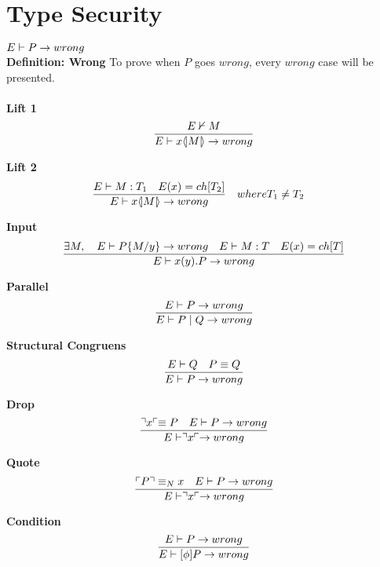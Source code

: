 \section{Type Security}

\begin{theorem}[Wrong]
\ensuremath{E \vdash P \ra wrong} \\
\textbf{Definition: Wrong}
To prove when \ensuremath{P} goes \ensuremath{wrong}, every \ensuremath{wrong} case will be presented.\\\\
\textbf{Lift 1} \begin{align*}
\frac{E \nvdash M}{E \vdash x \langle \! | M | \! \rangle \rightarrow wrong}
\end{align*}

\textbf{Lift 2} \begin{align*}
\frac{E \vdash M:T_1 \quad E(x)=ch[T_2]}{E \vdash x \langle \! | M | \! \rangle \rightarrow wrong} &\quad where T_1 \neq T_2
\end{align*}

\textbf{Input} \begin{align*}
\frac{\exists M,\quad E \vdash P\{ M/ y\} \rightarrow wrong \quad E \vdash M:T \quad E(x)= ch[T]} {E \vdash x(y).P \rightarrow wrong}\\
\end{align*}

\textbf{Parallel} \begin{align*}
\frac{E \vdash P \rightarrow wrong}{E \vdash P \mid Q \rightarrow wrong}
\end{align*}

\textbf{Structural Congruens} \begin{align*}
\frac{E \vdash Q \quad P \equiv Q}{E \vdash P \rightarrow wrong}
\end{align*}

\textbf{Drop}\begin{align*}
\frac{\urcorner x \ulcorner \equiv P \quad E \vdash P \rightarrow wrong}{E \vdash \urcorner x \ulcorner \rightarrow wrong}
\end{align*}

\textbf{Quote}\begin{align*}
\frac{\ulcorner P \urcorner \equiv _N x \quad E \vdash P \rightarrow wrong}{E \vdash \urcorner x \ulcorner \rightarrow wrong}
\end{align*}

\textbf{Condition}\begin{align*}
\frac{E \vdash P \rightarrow wrong}{E \vdash [\phi]P \rightarrow wrong}
\end{align*}


\end{theorem}

